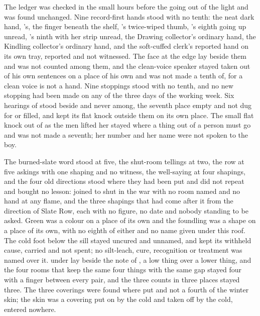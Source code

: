 The ledger was checked in the small hours before the going out of the light and was found unchanged. Nine record-first hands stood with no tenth: the neat dark hand, 's, the finger beneath the shelf, 's twice-wiped thumb, 's eighth going up unread, 's ninth with her strip unread, the Drawing collector's ordinary hand, the Kindling collector's ordinary hand, and the soft-cuffed clerk's reported hand on its own tray, reported and not witnessed. The face at the edge lay beside them and was not counted among them, and the clean-voice speaker stayed taken out of his own sentences on a place of his own and was not made a tenth of, for a clean voice is not a hand. Nine stoppings stood with no tenth, and no new stopping had been made on any of the three days of the working week. Six hearings of  stood beside and never among, the seventh place empty and not dug for or filled, and  kept its flat knock outside them on its own place. The small flat knock out of  as the men lifted her stayed where a thing out of a person must go and was not made a seventh; her number and her name were not spoken to the boy.

The burned-slate word stood at five, the shut-room tellings at two, the row at five askings with one shaping and no witness, the well-saying at four shapings, and the four old directions stood where they had been put and did not repeat and bought no lesson:  joined to  shut in the war with no room named and no hand at any flame, and the three shapings that had come after it from the direction of Slate Row, each with no figure, no date and nobody standing to be asked. Green was a colour on a place of its own and the foundling was a shape on a place of its own, with no eighth of either and no name given under this roof. The cold foot below the sill stayed uncured and unnamed, and  kept its withheld cause, carried and not spent; no silt-leach, cure, recognition or treatment was named over it.  under  lay beside the note of , a low thing over a lower thing, and the four rooms that keep the same four things with the same gap stayed four with a finger between every pair, and the three counts in three places stayed three. The three coverings were found where put and not a fourth of the winter skin; the skin was a covering put on by the cold and taken off by the cold, entered nowhere.

